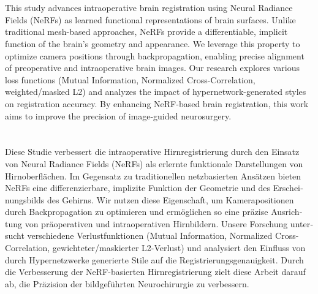 \chapter{\abstractname}

This study advances intraoperative brain registration using Neural Radiance Fields (NeRFs) as learned functional representations of brain surfaces. Unlike traditional mesh-based approaches, NeRFs provide a differentiable, implicit function of the brain's geometry and appearance. We leverage this property to optimize camera positions through backpropagation, enabling precise alignment of preoperative and intraoperative brain images. Our research explores various loss functions (Mutual Information, Normalized Cross-Correlation, weighted/masked L2) and analyzes the impact of hypernetwork-generated styles on registration accuracy. By enhancing NeRF-based brain registration, this work aims to improve the precision of image-guided neurosurgery.



\makeatletter
{}
{\renewcommand{\abstractname}{Kurzfassung}}
{\renewcommand{\abstractname}{Abstract}}
\makeatother

\chapter{\abstractname}

\begin{otherlanguage}{ngerman}
Diese Studie verbessert die intraoperative Hirnregistrierung durch den Einsatz von Neural Radiance Fields (NeRFs) als erlernte funktionale Darstellungen von Hirnoberflächen. Im Gegensatz zu traditionellen netzbasierten Ansätzen bieten NeRFs eine differenzierbare, implizite Funktion der Geometrie und des Erscheinungsbilds des Gehirns. Wir nutzen diese Eigenschaft, um Kamerapositionen durch Backpropagation zu optimieren und ermöglichen so eine präzise Ausrichtung von präoperativen und intraoperativen Hirnbildern. Unsere Forschung untersucht verschiedene Verlustfunktionen (Mutual Information, Normalized Cross-Correlation, gewichteter/maskierter L2-Verlust) und analysiert den Einfluss von durch Hypernetzwerke generierte Stile auf die Registrierungsgenauigkeit. Durch die Verbesserung der NeRF-basierten Hirnregistrierung zielt diese Arbeit darauf ab, die Präzision der bildgeführten Neurochirurgie zu verbessern.
\end{otherlanguage}


\makeatletter
{}
{\renewcommand{\abstractname}{Abstract}}
{\renewcommand{\abstractname}{Kurzfassung}}
\makeatother